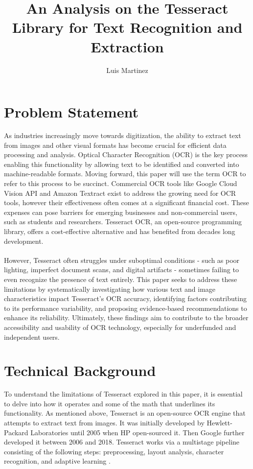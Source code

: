 \documentclass[10pt,twocolumn]{article}
\title{An Analysis on the Tesseract Library for Text Recognition and Extraction}
\author{Luis Martinez}
\affiliation{Occidental College}
\begin{document}
\maketitle

\section{Problem Statement}

	As industries increasingly move towards digitization, the ability to extract text from images and other visual formats has become crucial for efficient data processing and analysis. Optical Character Recognition (OCR) is the key process enabling this functionality by allowing text to be identified and converted into machine-readable formats. Moving forward, this paper will use the term OCR to refer to this process to be succinct. Commercial OCR tools like Google Cloud Vision API and Amazon Textract exist to address the growing need for OCR tools, however their effectiveness often comes at a significant financial cost. These expenses can pose barriers for emerging businesses and non-commercial users, such as students and researchers. Tesseract OCR, an open-source programming library, offers a cost-effective alternative and has benefited from decades long development.\paragraph{} However, Tesseract often struggles under suboptimal conditions - such as poor lighting, imperfect document scans, and digital artifacts - sometimes failing to even recognize the presence of text entirely. This paper seeks to address these limitations by systematically investigating how various text and image characteristics impact Tesseract's OCR accuracy, identifying factors contributing to its performance variability, and proposing evidence-based recommendations to enhance its reliability. Ultimately, these findings aim to contribute to the broader accessibility and usability of OCR technology, especially for underfunded and independent users. 

\section{Technical Background}

To understand the limitations of Tesseract explored in this paper, it is essential to delve into how it operates and some of the math that underlines its functionality. As mentioned above, Tesseract is an open-source OCR engine that attempts to extract text from images. It was initially developed by Hewlett-Packard Laboratories until 2005 when HP open-sourced it. Then Google further developed it between 2006 and 2018\cite{github_repo}. Tesseract works via a multistage pipeline consisting of the following steps: preprocessing, layout analysis, character recognition, and adaptive learning\cite{Overview_Akhil} \cite{Overview_Smith}. 
\end{document}
